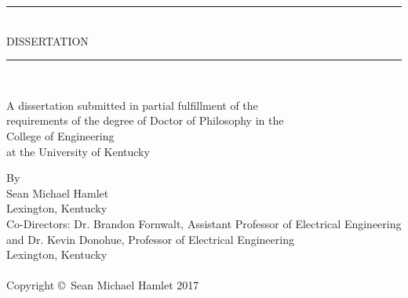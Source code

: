 

\begin{titlepage}
\begin{center}
	
	\makeatletter
	\@title
	\makeatother
	
	\vspace{0.75in}
	
	\rule{3.5in}{0.5pt}\\ %
	\bigskip
	DISSERTATION\\
	\smallskip
	\rule{3.5in}{0.5pt}\\ %
	
	\bigskip
	
	A dissertation submitted in partial fulfillment of the\\
	requirements of the degree of Doctor of Philosophy in the\\
	College of Engineering\\
	at the University of Kentucky
	
	\bigskip
	\bigskip
	
	By \\
	\bigskip
	Sean Michael Hamlet\\
	\bigskip
	Lexington, Kentucky\\
	\bigskip
	Co-Directors: Dr. Brandon Fornwalt, Assistant Professor of Electrical Engineering\\
	and Dr. Kevin Donohue, Professor of Electrical Engineering\\
	\bigskip
	Lexington, Kentucky\\
	\\
	\bigskip
	Copyright \copyright\ Sean Michael Hamlet 2017
\end{center}
\end{titlepage}

\restoregeometry